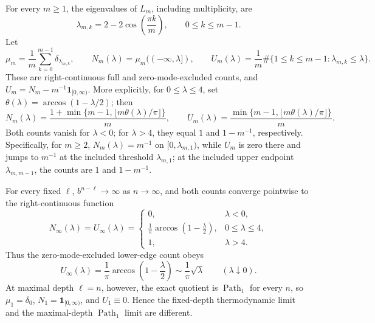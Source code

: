For every \(m\geq1\), the eigenvalues of \(L_m\), including multiplicity, are
\begin{equation}
\lambda_{m,k}=2-2\cos\left(\frac{\pi k}{m}\right),
\qquad 0\leq k\leq m-1.
\label{eq:rg-path-laplacian-eigenvalues}
\end{equation}
Let
\begin{equation}
\mu_m=\frac1m\sum_{k=0}^{m-1}\delta_{\lambda_{m,k}},
\qquad
N_m(\lambda)=\mu_m((-\infty,\lambda]),
\qquad
U_m(\lambda)=\frac1m
\#\{1\leq k\leq m-1:\lambda_{m,k}\leq\lambda\}.
\label{eq:rg-path-spectral-counts}
\end{equation}
These are right-continuous full and zero-mode-excluded counts, and
\(U_m=N_m-m^{-1}\mathbf1_{[0,\infty)}\).  More explicitly, for
\(0\leq\lambda\leq4\), set
\(\theta(\lambda)=\arccos(1-\lambda/2)\); then
\begin{equation}
N_m(\lambda)
=\frac{1+\min\{m-1,\lfloor m\theta(\lambda)/\pi\rfloor\}}{m},
\qquad
U_m(\lambda)
=\frac{\min\{m-1,\lfloor m\theta(\lambda)/\pi\rfloor\}}{m}.
\label{eq:rg-path-exact-counts}
\end{equation}
Both counts vanish for \(\lambda<0\); for \(\lambda>4\), they equal
\(1\) and \(1-m^{-1}\), respectively.  Specifically, for \(m\geq2\),
\(N_m(\lambda)=m^{-1}\) on
\([0,\lambda_{m,1})\), while \(U_m\) is zero there and jumps to \(m^{-1}\)
at the included threshold \(\lambda_{m,1}\); at the included upper endpoint
\(\lambda_{m,m-1}\), the counts are \(1\) and \(1-m^{-1}\).

For every fixed \(\ell\), \(b^{n-\ell}\to\infty\) as \(n\to\infty\), and both
counts converge pointwise to the right-continuous function
\begin{equation}
N_\infty(\lambda)=U_\infty(\lambda)
=
\begin{cases}
0,&\lambda<0,\\[2pt]
\displaystyle\frac1\pi\arccos\left(1-\frac{\lambda}{2}\right),
&0\leq\lambda\leq4,\\[7pt]
1,&\lambda>4.
\end{cases}
\label{eq:rg-path-thermodynamic-count}
\end{equation}
Thus the zero-mode-excluded lower-edge count obeys
\begin{equation}
U_\infty(\lambda)
=\frac1\pi\arccos\left(1-\frac{\lambda}{2}\right)
\sim\frac1\pi\sqrt{\lambda}
\qquad(\lambda\downarrow0).
\label{eq:rg-path-lower-edge-count}
\end{equation}
At maximal depth \(\ell=n\), however, the exact quotient is
\(\operatorname{Path}_1\) for every
\(n\), so \(\mu_1=\delta_0\),
\(N_1=\mathbf1_{[0,\infty)}\), and \(U_1\equiv0\).  Hence the fixed-depth
thermodynamic limit and the maximal-depth \(\operatorname{Path}_1\) limit are
different.

